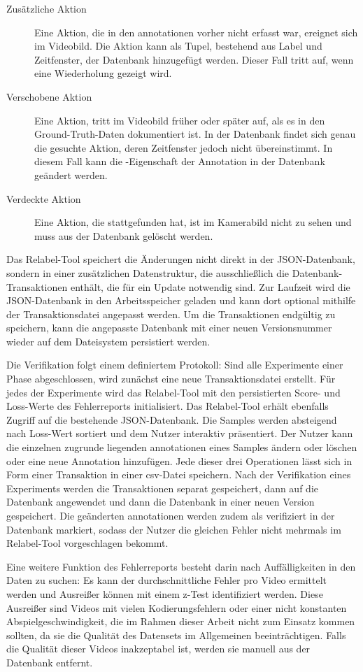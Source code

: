 \begin{description}
    \item[Zusätzliche Aktion] Eine Aktion, die in den \gls{annotationen} vorher nicht erfasst war, ereignet sich im Videobild.
    Die Aktion kann als Tupel, bestehend aus Label und Zeitfenster, der Datenbank hinzugefügt werden.
    Dieser Fall tritt \zB auf, wenn eine Wiederholung gezeigt wird.
    \item[Verschobene Aktion] Eine Aktion, tritt im Videobild früher oder später auf, als es in den Ground-Truth-Daten dokumentiert ist.
    In der Datenbank findet sich genau die gesuchte Aktion, deren Zeitfenster jedoch nicht übereinstimmt.
    In diesem Fall kann die -Eigenschaft der Annotation in der Datenbank geändert werden.
    \item[Verdeckte Aktion] Eine Aktion, die stattgefunden hat, ist im Kamerabild nicht zu sehen und muss aus der Datenbank gelöscht werden.
\end{description}

Das Relabel-Tool speichert die Änderungen nicht direkt in der JSON-Datenbank, sondern in einer zusätzlichen Datenstruktur, die ausschließlich die Datenbank-Transaktionen enthält, die für ein Update notwendig sind.
Zur Laufzeit wird die JSON-Datenbank in den Arbeitsspeicher geladen und kann dort optional mithilfe der Transaktionsdatei angepasst werden.
Um die Transaktionen endgültig zu speichern, kann die angepasste Datenbank mit einer neuen Versionsnummer wieder auf dem Dateisystem persistiert werden.

Die Verifikation folgt einem definiertem Protokoll:
Sind alle Experimente einer Phase abgeschlossen, wird zunächst eine neue Transaktionsdatei erstellt.
Für jedes der Experimente wird das Relabel-Tool mit den persistierten Score- und Loss-Werte des Fehlerreports initialisiert.
Das Relabel-Tool erhält ebenfalls Zugriff auf die bestehende JSON-Datenbank.
Die Samples werden absteigend nach Loss-Wert sortiert und dem Nutzer interaktiv präsentiert.
Der Nutzer kann die einzelnen zugrunde liegenden \gls{annotationen} eines Samples ändern oder löschen oder eine neue Annotation hinzufügen.
Jede dieser drei Operationen lässt sich in Form einer Transaktion in einer \gls{csv}-Datei speichern.
Nach der Verifikation eines Experiments werden die Transaktionen separat gespeichert, dann auf die Datenbank angewendet und dann die Datenbank in einer neuen Version gespeichert.
Die geänderten \gls{annotationen} werden zudem als verifiziert in der Datenbank markiert, sodass der Nutzer die gleichen Fehler nicht mehrmals im Relabel-Tool vorgeschlagen bekommt.

Eine weitere Funktion des Fehlerreports besteht darin nach Auffälligkeiten in den Daten zu suchen:
Es kann der durchschnittliche Fehler pro Video ermittelt werden und Ausreißer können mit einem z-Test identifiziert werden.
Diese Ausreißer sind \zB Videos mit vielen Kodierungsfehlern oder einer nicht konstanten Abspielgeschwindigkeit, die im Rahmen dieser Arbeit nicht zum Einsatz kommen sollten, da sie die Qualität des Datensets im Allgemeinen beeinträchtigen.
Falls die Qualität dieser Videos inakzeptabel ist, werden sie manuell aus der Datenbank entfernt.
